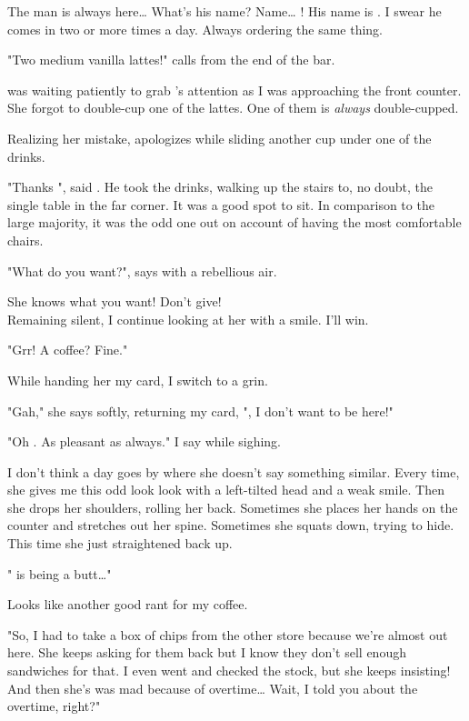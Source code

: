 \noindent
The man is always here\ldots{} What's his name? Name\ldots{} \dameon!
His name is \dameon. I swear he comes in two or more times a day.
Always ordering the same thing.
\VV


"Two medium vanilla lattes!" \april{} calls from the end of the bar.
\VV


\noindent
\dameon{} was waiting patiently to grab \april's attention
as I was approaching the front counter.
She forgot to double-cup one of the lattes.
One of them is \textit{always} double-cupped.
\VV


\noindent
Realizing her mistake, \april{} apologizes while sliding another cup
under one of the drinks.
\VV


"Thanks \april", said \dameon{}.
He took the drinks, walking up the stairs to, no doubt, the single table
in the far corner.  It was a good spot to sit.  In comparison to the large
majority, it was the odd one out on account of having the most comfortable
chairs.
\VV


"What do you want?", \april{} says with a rebellious air.
\VV


\noindent
She knows what you want! Don't give! \\
Remaining silent, I continue looking at her with a smile.
I'll win.
\VV


"Grr! A coffee? Fine."
\VV


\noindent
While handing her my card, I switch to a grin.
\VV


"Gah," she says softly, returning my card, "\josh, I don't want to be here!"


"Oh \april. As pleasant as always."  I say while sighing.
\VV


\noindent
I don't think a day goes by where she doesn't say something similar.
Every time, she gives me this odd look look with a left-tilted head
and a weak smile.  Then she drops her shoulders, rolling her back.
Sometimes she places her hands on the counter and stretches out her spine.
Sometimes she squats down, trying to hide.
This time she just straightened back up.
\VV


"\jasmine{} is being a butt\ldots"
\VV


\noindent
Looks like another good rant for my coffee.
\VV


"So, I had to take a box of chips from the other store
because we're almost out here.  She keeps asking for them back
but I know they don't sell enough sandwiches for that.
I even went and checked the stock, but she keeps insisting!
And then she's was mad because of overtime\ldots{}
Wait, I told you about the overtime, right?"
\VV



